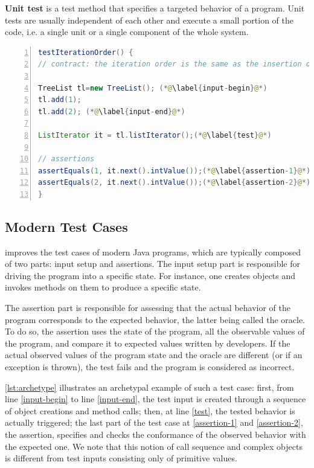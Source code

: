\textbf{Unit test} is a test method that specifies a targeted behavior of a program. Unit tests are usually independent of each other and execute a small portion of the code, i.e. a single unit or a single component of the whole system.


\begin{lstlisting}[caption={An example of an object-oriented test case  (inspired from Apache Commons Collections)},label=lst:archetype,float,language=java,numbers=left] 
testIterationOrder() {
// contract: the iteration order is the same as the insertion order

TreeList tl=new TreeList(); (*@\label{input-begin}@*)
tl.add(1);
tl.add(2); (*@\label{input-end}@*)

ListIterator it = tl.listIterator();(*@\label{test}@*)

// assertions
assertEquals(1, it.next().intValue());(*@\label{assertion-1}@*)
assertEquals(2, it.next().intValue());(*@\label{assertion-2}@*)
}
\end{lstlisting}

\subsection{Modern Test Cases}
\label{subsec:test-case-explanation}

\dspot improves the test cases of modern Java programs, which are typically composed of two parts: input setup and assertions. 
The input setup part is responsible for driving the program into a specific state.
For instance, one creates objects and invokes methods on them to produce a specific state.

The assertion part is responsible for assessing that the actual behavior of the program corresponds to the expected behavior, the latter being called the oracle.
To do so, the assertion uses the state of the program, \ie all the observable values of the program, and compare it to expected values written by developers.
If the actual observed values of the program state and the oracle are different (or if an exception is thrown), the test fails and the program is considered as incorrect.

\autoref{lst:archetype} illustrates an archetypal example of such a test case: 
first, from line \autoref{input-begin} to line \autoref{input-end}, the test input is created through a sequence of object creations and method calls; 
then, at line \autoref{test}, the tested behavior is actually triggered; 
the last part of the test case at \autoref{assertion-1} and \autoref{assertion-2}, the assertion, specifies and checks the conformance of the observed behavior with the expected one.
We note that this notion of call sequence and complex objects is different from test inputs consisting only of primitive values.

